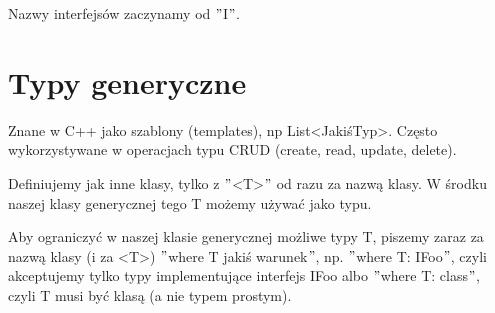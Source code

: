 \documentclass[10pt]{article}
\begin{document}
Nazwy interfejsów zaczynamy od $"$I$"$.

\section{Typy generyczne}
Znane w C++ jako szablony (templates), np List<JakiśTyp>. Często wykorzystywane w operacjach typu CRUD (create, read, update, delete).

Definiujemy jak inne klasy, tylko z $"$<T>$"$ od razu za nazwą klasy. W środku naszej klasy generycznej tego T możemy używać jako typu.

Aby ograniczyć w naszej klasie generycznej możliwe typy T, piszemy zaraz za nazwą klasy (i za <T>) $"$where T jakiś warunek$"$, np. $"$where T: IFoo$"$, czyli akceptujemy tylko typy implementujące interfejs IFoo albo $"$where T: class$"$, czyli T musi być klasą (a nie typem prostym).
\end{document}
